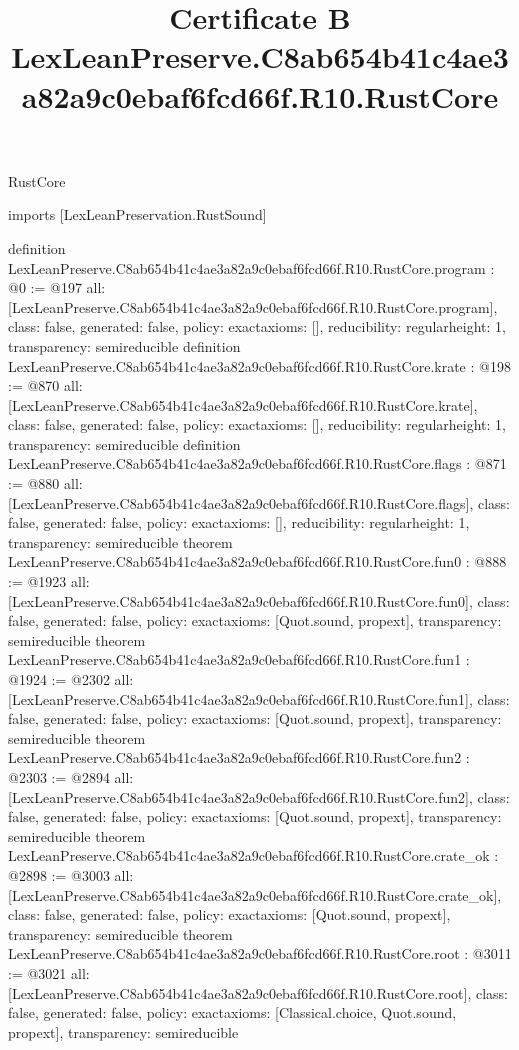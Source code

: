 \begin{lexlean}{RustCore}
\title{Certificate B LexLeanPreserve.C8ab654b41c4ae3a82a9c0ebaf6fcd66f.R10.RustCore}
\begin{coremodule}
imports [LexLeanPreservation.RustSound]

definition LexLeanPreserve.C8ab654b41c4ae3a82a9c0ebaf6fcd66f.R10.RustCore.program : @0 := @197 {
  all: [LexLeanPreserve.C8ab654b41c4ae3a82a9c0ebaf6fcd66f.R10.RustCore.program],
  class: false,
  generated: false,
  policy: exact{axioms: []},
  reducibility: regular{height: 1},
  transparency: semireducible
}
definition LexLeanPreserve.C8ab654b41c4ae3a82a9c0ebaf6fcd66f.R10.RustCore.krate : @198 := @870 {
  all: [LexLeanPreserve.C8ab654b41c4ae3a82a9c0ebaf6fcd66f.R10.RustCore.krate],
  class: false,
  generated: false,
  policy: exact{axioms: []},
  reducibility: regular{height: 1},
  transparency: semireducible
}
definition LexLeanPreserve.C8ab654b41c4ae3a82a9c0ebaf6fcd66f.R10.RustCore.flags : @871 := @880 {
  all: [LexLeanPreserve.C8ab654b41c4ae3a82a9c0ebaf6fcd66f.R10.RustCore.flags],
  class: false,
  generated: false,
  policy: exact{axioms: []},
  reducibility: regular{height: 1},
  transparency: semireducible
}
theorem LexLeanPreserve.C8ab654b41c4ae3a82a9c0ebaf6fcd66f.R10.RustCore.fun0 : @888 := @1923 {
  all: [LexLeanPreserve.C8ab654b41c4ae3a82a9c0ebaf6fcd66f.R10.RustCore.fun0],
  class: false,
  generated: false,
  policy: exact{axioms: [Quot.sound, propext]},
  transparency: semireducible
}
theorem LexLeanPreserve.C8ab654b41c4ae3a82a9c0ebaf6fcd66f.R10.RustCore.fun1 : @1924 := @2302 {
  all: [LexLeanPreserve.C8ab654b41c4ae3a82a9c0ebaf6fcd66f.R10.RustCore.fun1],
  class: false,
  generated: false,
  policy: exact{axioms: [Quot.sound, propext]},
  transparency: semireducible
}
theorem LexLeanPreserve.C8ab654b41c4ae3a82a9c0ebaf6fcd66f.R10.RustCore.fun2 : @2303 := @2894 {
  all: [LexLeanPreserve.C8ab654b41c4ae3a82a9c0ebaf6fcd66f.R10.RustCore.fun2],
  class: false,
  generated: false,
  policy: exact{axioms: [Quot.sound, propext]},
  transparency: semireducible
}
theorem LexLeanPreserve.C8ab654b41c4ae3a82a9c0ebaf6fcd66f.R10.RustCore.crate_ok : @2898 := @3003 {
  all: [LexLeanPreserve.C8ab654b41c4ae3a82a9c0ebaf6fcd66f.R10.RustCore.crate_ok],
  class: false,
  generated: false,
  policy: exact{axioms: [Quot.sound, propext]},
  transparency: semireducible
}
theorem LexLeanPreserve.C8ab654b41c4ae3a82a9c0ebaf6fcd66f.R10.RustCore.root : @3011 := @3021 {
  all: [LexLeanPreserve.C8ab654b41c4ae3a82a9c0ebaf6fcd66f.R10.RustCore.root],
  class: false,
  generated: false,
  policy: exact{axioms: [Classical.choice, Quot.sound, propext]},
  transparency: semireducible
}


\end{coremodule}
\end{lexlean}
